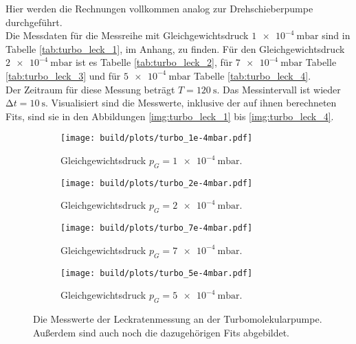         \noindent
        Hier werden die Rechnungen vollkommen analog zur Drehschieberpumpe durchgeführt.\\
        Die Messdaten für die Messreihe mit Gleichgewichtsdruck $\SI{1e-4}{\milli\bar}$ sind in Tabelle \ref{tab:turbo_leck_1}, im Anhang, zu finden.
        Für den Gleichgewichtsdruck $\SI{2e-4}{\milli\bar}$ ist es Tabelle \ref{tab:turbo_leck_2}, für  $\SI{7e-4}{\milli\bar}$ Tabelle \ref{tab:turbo_leck_3}
        und für $\SI{5e-4}{\milli\bar}$ Tabelle \ref{tab:turbo_leck_4}.\\
        Der Zeitraum für diese Messung beträgt $ T = \SI{120}{\second}$. Das Messintervall ist wieder $ \increment t = \SI{10}{\second}$.
        Visualisiert sind die Messwerte, inklusive der auf ihnen berechneten Fits, sind sie in den Abbildungen \ref{img:turbo_leck_1} bis \ref{img:turbo_leck_4}.
        \begin{figure}[H]
          \begin{subfigure}{0.46\textwidth}
                  \centering
                  \texttt{[image: build/plots/turbo\_1e-4mbar.pdf]}
                  \label{img:dreh_leck_1}
                  \caption{Gleichgewichtsdruck $p_G = \SI{1e-4}{\milli\bar}$.}
          \end{subfigure}
          \hfill
          \begin{subfigure}{0.46\textwidth}
                  \centering
                  \texttt{[image: build/plots/turbo\_2e-4mbar.pdf]}
                  \label{img:dreh_leck_2}
                  \caption{Gleichgewichtsdruck $p_G = \SI{2e-4}{\milli\bar}$.}
          \end{subfigure}
          \hfill
          \begin{subfigure}{0.46\textwidth}
            \centering
            \texttt{[image: build/plots/turbo\_7e-4mbar.pdf]}
            \label{img:dreh_leck_3}
            \caption{Gleichgewichtsdruck $p_G = \SI{7e-4}{\milli\bar}$.}
          \end{subfigure}
          \hfill
          \begin{subfigure}{0.46\textwidth}
            \centering
            \texttt{[image: build/plots/turbo\_5e-4mbar.pdf]}
            \label{img:dreh_leck_4}
            \caption{Gleichgewichtsdruck $p_G = \SI{5e-4}{\milli\bar}$.}
          \end{subfigure}
          \caption{Die Messwerte der Leckratenmessung an der Turbomolekularpumpe.\\
          Außerdem sind auch noch die dazugehörigen Fits abgebildet. }
      \end{figure}

